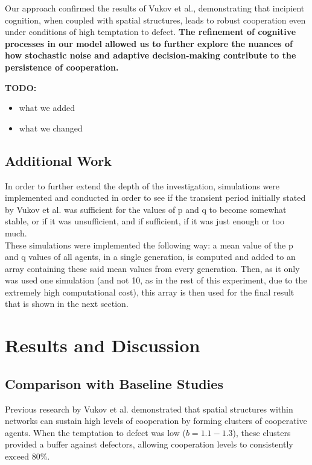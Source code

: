 \documentclass[runningheads]{llncs}
\begin{document}
Our approach confirmed the results of Vukov et al., demonstrating that incipient cognition, when coupled with spatial structures, leads to robust cooperation even under conditions of high temptation to defect. \textbf{The refinement of cognitive processes in our model allowed us to further explore the nuances of how stochastic noise and adaptive decision-making contribute to the persistence of cooperation.}

\textbf{TODO:}
\begin{itemize}
    \item what we added
    \item what we changed
\end{itemize}


\subsection{Additional Work}

In order to further extend the depth of the investigation, simulations were 
implemented and conducted in order to see if the transient period initially 
stated by Vukov et al. was sufficient for the values of p and q to become
somewhat stable, or if it was unsufficient, and if sufficient, if it was just
enough or too much.\\
These simulations were implemented the following way: a mean value of the
p and q values of all agents, in a single generation, is computed and added to an
array containing these said mean values from every generation. Then, as it only
was used one simulation (and not 10, as in the rest of this experiment, due 
to the extremely high computational cost), this array is then used for the
final result that is shown in the next section. 



\section{Results and Discussion}

\subsection{Comparison with Baseline Studies}
Previous research by Vukov et al. demonstrated that spatial structures within networks can sustain high levels of cooperation by forming clusters of cooperative agents. When the temptation to defect was low (\( b = 1.1 - 1.3 \)), these clusters provided a buffer against defectors, allowing cooperation levels to consistently exceed 80\%.
\end{document}
